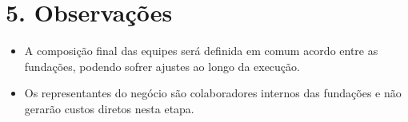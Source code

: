 \documentclass[12pt,a4paper]{report}
\begin{document}
\section*{5. Observações}

\begin{itemize}
    \item A composição final das equipes será definida em comum acordo entre as fundações, podendo sofrer ajustes ao longo da execução.
    \item Os representantes do negócio são colaboradores internos das fundações e não gerarão custos diretos nesta etapa.
\end{itemize}
\end{document}
